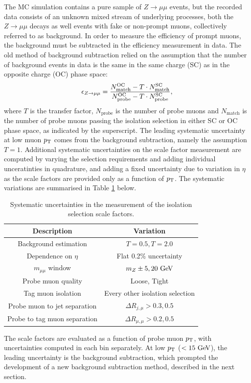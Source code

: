 The MC simulation contains a pure sample of $Z\rightarrow\mu\mu$ events,
but the recorded data consists of an unknown mixed stream of underlying
processes, both the $Z\rightarrow\mu\mu$ decays as well events with fake
or non-prompt muons, collectively referred to as background. In order
to measure the efficiency of prompt muons, the background must be
subtracted in the efficiency measurement in data. The old method of
background subtraction relied on the assumption that the number of
background events in data is the same in the same charge
(SC) as in the opposite charge (OC) phase space:
\begin{equation}
\epsilon_{Z \rightarrow \mu\mu} =
\frac{N_\text{match}^\text{OC} - T \cdot N_\text{match}^\text{SC}}
     {N_\text{probe}^\text{OC} - T \cdot N_\text{probe}^\text{SC}},
\end{equation}
where $T$ is the transfer factor, $N_\text{probe}$ is the number of
probe muons and $N_\text{match}$ is the number of probe muons passing
the isolation selection in either SC or OC phase space, as indicated by
the superscript. The leading systematic uncertainty at low muon $p_{\text{T}}$
comes from the background subtraction, namely the assumption $T=1$.
Additional systematic uncertainties on the scale factor
measurement are computed by varying the selection requirements and
adding individual unceratinties in quadrature, and adding a fixed
uncertainty due to variation in $\eta$ as the scale factors are
provided only as a function of $p_{\text{T}}$. The systematic variations are
summarised in Table \ref{tab:muon:systs} below.
\begin{table}[h]
\centering
\caption{Systematic uncertainties in the measurement of the isolation
selection scale factors.}
\label{tab:muon:systs}
\begin{tabular}{c c}
\toprule
Description & Variation \\
\midrule
Background estimation         & $T=0.5, T=2.0$ \\
Dependence on $\eta$          & Flat 0.2\% uncertainty \\
$m_{\mu\mu}$ window           & $m_Z \pm 5, 20~\text{Ge\kern -0.1em V}$ \\ 
Probe muon quality            & Loose, Tight \\
Tag muon isolation            & Every other isolation selection \\ 
Probe muon to jet separation  & $\Delta R_{j, \mu} > 0.3, 0.5$ \\
Probe to tag muon separation  & $\Delta R_{\mu, \mu} > 0.2, 0.5$ \\
\bottomrule
\end{tabular}
\end{table}
The scale factors are evaluated as a function of probe muon $p_{\text{T}}$,
with uncertainties computed in each bin separately. At low $p_{\text{T}}$
($< 15~\text{Ge\kern -0.1em V}$), the leading uncertainty is the background subtraction,
which prompted the development of a new background subtraction
method, described in the next section.

